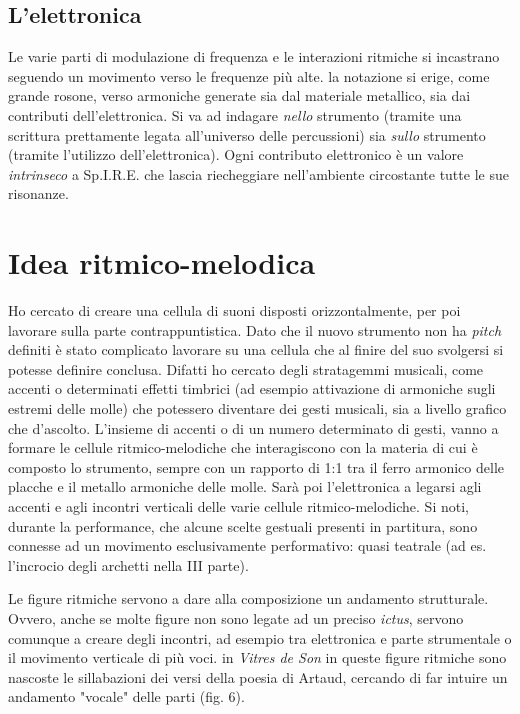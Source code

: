 
\subsection*{L'elettronica}

Le varie parti di modulazione di frequenza e le interazioni ritmiche si incastrano seguendo un movimento verso le frequenze più alte. la notazione si erige, come grande rosone, verso armoniche generate sia dal materiale metallico, sia dai contributi dell'elettronica.  Si va ad indagare \textit{nello} strumento (tramite una scrittura prettamente legata all'universo delle percussioni) sia \textit{sullo} strumento (tramite l'utilizzo dell'elettronica). Ogni contributo elettronico è un valore \textit{intrinseco} a Sp.I.R.E. che lascia riecheggiare nell'ambiente circostante tutte le sue risonanze.


\section{Idea ritmico-melodica}

Ho cercato di creare una cellula di suoni disposti orizzontalmente, per poi lavorare sulla parte contrappuntistica. Dato che il nuovo strumento non ha \textit{pitch} definiti è stato complicato lavorare su una cellula che al finire del suo svolgersi si potesse definire conclusa. Difatti ho cercato degli stratagemmi musicali, come accenti o determinati effetti timbrici (ad esempio attivazione di armoniche sugli estremi delle molle) che potessero diventare dei gesti musicali, sia a livello grafico che d'ascolto. L'insieme di accenti o di un numero determinato di gesti, vanno a formare le cellule ritmico-melodiche che interagiscono con la materia di cui è composto lo strumento, sempre con un rapporto di 1:1 tra il ferro armonico delle placche e il metallo armoniche delle molle.
Sarà poi l'elettronica a legarsi agli accenti e agli incontri verticali delle varie cellule ritmico-melodiche. Si noti, durante la performance, che alcune scelte gestuali presenti in partitura, sono connesse ad un movimento esclusivamente performativo: quasi teatrale (ad es. l'incrocio degli archetti nella III parte).

Le figure ritmiche servono a dare alla composizione un andamento strutturale. Ovvero, anche se molte figure non sono legate ad un preciso \textit{ictus}, servono comunque a creare degli incontri, ad esempio tra elettronica e parte strumentale o il movimento verticale di più voci. in \textit{Vitres de Son} in queste figure ritmiche sono nascoste le sillabazioni dei versi della poesia di Artaud, cercando di far intuire un andamento "vocale" delle parti (fig. 6).

